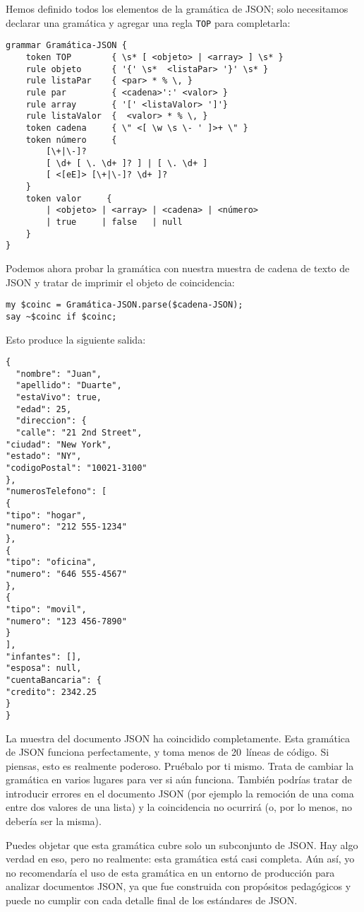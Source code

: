 Hemos definido todos los elementos de la gramática de JSON;
solo necesitamos declarar una gramática y agregar una regla
{\tt TOP} para completarla:

\begin{verbatim}
grammar Gramática-JSON {
	token TOP        { \s* [ <objeto> | <array> ] \s* }
	rule objeto      { '{' \s*  <listaPar> '}' \s* }
	rule listaPar    { <par> * % \, }
	rule par  		 { <cadena>':' <valor> }
	rule array       { '[' <listaValor> ']'}
	rule listaValor  {  <valor> * % \, }
	token cadena 	 { \" <[ \w \s \- ' ]>+ \" }
	token número 	 {
		[\+|\-]?
		[ \d+ [ \. \d+ ]? ] | [ \. \d+ ]
		[ <[eE]> [\+|\-]? \d+ ]?
	}
	token valor 	{ 
		| <objeto> | <array> | <cadena> | <número> 
		| true     | false   | null 
	}
}
\end{verbatim}

Podemos ahora probar la gramática con nuestra muestra de 
cadena de texto de JSON y tratar de imprimir el objeto de
coincidencia:

\begin{verbatim}
my $coinc = Gramática-JSON.parse($cadena-JSON);
say ~$coinc if $coinc;
\end{verbatim}

Esto produce la siguiente salida:

\begin{verbatim}
{
  "nombre": "Juan",
  "apellido": "Duarte",
  "estaVivo": true,
  "edad": 25,
  "direccion": {
  "calle": "21 2nd Street",
"ciudad": "New York",
"estado": "NY",
"codigoPostal": "10021-3100"
},
"numerosTelefono": [
{
"tipo": "hogar",
"numero": "212 555-1234"
},
{
"tipo": "oficina",
"numero": "646 555-4567"
},
{
"tipo": "movil",
"numero": "123 456-7890"
}
],
"infantes": [],
"esposa": null,  
"cuentaBancaria": {
"credito": 2342.25
}
}
\end{verbatim}

La muestra del documento JSON ha coincidido completamente.
Esta gramática de JSON funciona perfectamente, y toma menos
de 20~líneas de código. Si piensas, esto es realmente poderoso.
Pruébalo por ti mismo. Trata de cambiar la gramática en varios
lugares para ver si aún funciona. También podrías tratar
de introducir errores en el documento JSON (por ejemplo la remoción
de una coma entre dos valores de una lista) y la coincidencia
no ocurrirá (o, por lo menos, no debería ser la misma).

Puedes objetar que esta gramática cubre solo un subconjunto de JSON.
Hay algo verdad en eso, pero no realmente: esta gramática está casi 
completa. Aún así, yo no recomendaría el uso de esta gramática
en un entorno de producción para analizar documentos JSON,
ya que fue construida con propósitos pedagógicos y puede no cumplir
con cada detalle final de los estándares de JSON.

